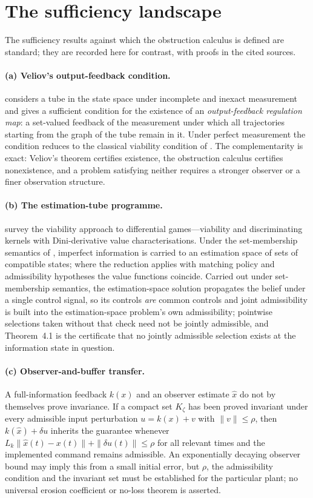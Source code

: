 \section{The sufficiency landscape}\label{S:landscape}

The sufficiency results against which the obstruction calculus is defined are standard; they are recorded here for contrast, with proofs in the cited sources.

\paragraph{(a) Veliov's output-feedback condition.} \citet{veliov1993} considers a tube in the state space under incomplete and inexact measurement and gives a sufficient condition for the existence of an \emph{output-feedback regulation map}: a set-valued feedback of the measurement under which all trajectories starting from the graph of the tube remain in it. Under perfect measurement the condition reduces to the classical viability condition of \citet{haddad1981}. The complementarity is exact: Veliov's theorem certifies existence, the obstruction calculus certifies nonexistence, and a problem satisfying neither requires a stronger observer or a finer observation structure.

\paragraph{(b) The estimation-tube programme.} \citet{cardaliaguet2007} survey the viability approach to differential games---viability and discriminating kernels with Dini-derivative value characterisations. Under the set-membership semantics of \citet{kurzhanski1997}, imperfect information is carried to an estimation space of sets of compatible states; where the reduction applies with matching policy and admissibility hypotheses the value functions coincide. Carried out under set-membership semantics, the estimation-space solution propagates the belief under a single control signal, so its controls \emph{are} common controls and joint admissibility is built into the estimation-space problem's own admissibility; pointwise selections taken without that check need not be jointly admissible, and Theorem~4.1 is the certificate that no jointly admissible selection exists at the information state in question.

\paragraph{(c) Observer-and-buffer transfer.} A full-information feedback $k(x)$ and an observer estimate $\hat x$ do not by themselves prove invariance. If a compact set $K_\zeta$ has been proved invariant under every admissible input perturbation $u=k(x)+v$ with $\|v\|\le\rho$, then $k(\hat x)+\delta u$ inherits the guarantee whenever $L_k\|\hat x(t)-x(t)\|+\|\delta u(t)\|\le\rho$ for all relevant times and the implemented command remains admissible. An exponentially decaying observer bound may imply this from a small initial error, but $\rho$, the admissibility condition and the invariant set must be established for the particular plant; no universal erosion coefficient or no-loss theorem is asserted.

